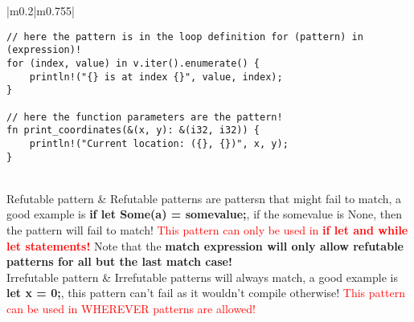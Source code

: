 \documentclass[main.tex,fontsize=8pt,paper=a4,paper=portrait,DIV=calc,]{scrartcl}
\begin{document}
\begin{table}[ht!]
\begin{tabular}{|m{0.2\linewidth}|m{0.755\linewidth}|}
\begin{lstlisting}
// here the pattern is in the loop definition for (pattern) in (expression)!
for (index, value) in v.iter().enumerate() {
    println!("{} is at index {}", value, index);
}

// here the function parameters are the pattern!
fn print_coordinates(&(x, y): &(i32, i32)) {
    println!("Current location: ({}, {})", x, y);
}
\end{lstlisting}\\
\hline
Refutable pattern & 
\textcolor{OliveGreen}{Refutable patterns are pattersn that might fail to match, a good example is \textbf{if let Some(a) = somevalue;}, if the somevalue is None, then the pattern will fail to match!}\newline
\textcolor{red}{This pattern can only be used in \textbf{if let and while let statements!}}\newline
Note that the \textbf{match expression will only allow refutable patterns for all but the last match case!}\\
\hline
Irrefutable pattern & 
\textcolor{OliveGreen}{Irrefutable patterns will always match, a good example is \textbf{let x = 0;}, this pattern can't fail as it wouldn't compile otherwise!} \newline
\textcolor{red}{This pattern can be used in WHEREVER patterns are allowed!}\\
\hline
\end{tabular}
\end{table}
\pagebreak 
\end{document}
